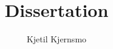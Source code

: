 \documentclass[a4paper, 12pt, draft]{scrartcl}
\begin{document}
\title{Dissertation}
\author{Kjetil Kjernsmo}


\maketitle







\end{document}
